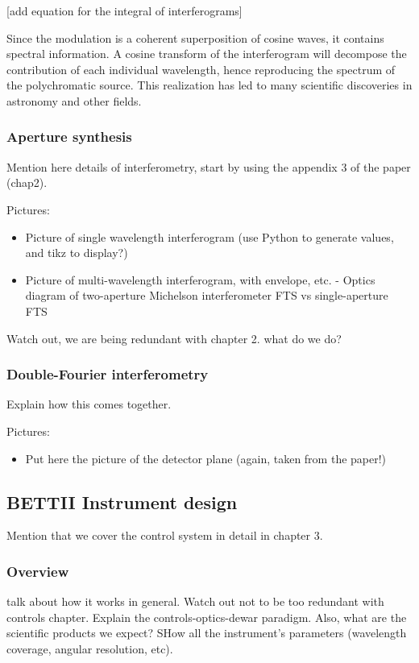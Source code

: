 [add equation for the integral of interferograms]



Since the modulation is a coherent superposition of cosine waves, it contains spectral information. A cosine transform of the interferogram will decompose the contribution of each individual wavelength, hence reproducing the spectrum of the polychromatic source. This realization has led to many scientific discoveries in astronomy and other fields.

\subsubsection{Aperture synthesis}
Mention here details of interferometry, start by using the appendix 3 of the paper (chap2). 

Pictures:
\begin{itemize}
\item Picture of single wavelength interferogram (use Python to generate values, and tikz to display?)
\item Picture of multi-wavelength interferogram, with envelope, etc.
- Optics diagram of two-aperture Michelson interferometer FTS vs single-aperture FTS
\end{itemize}

Watch out, we are being redundant with chapter 2. what do we do?

\subsubsection{Double-Fourier interferometry}

Explain how this comes together.

Pictures:
\begin{itemize}
\item Put here the picture of the detector plane (again, taken from the paper!)
\end{itemize}


\subsection{BETTII Instrument design}

Mention that we cover the control system in detail in chapter 3.

\subsubsection{Overview}
talk about how it works in general. Watch out not to be too redundant with controls chapter. Explain the controls-optics-dewar paradigm. Also, what are the scientific products we expect? SHow all the instrument's parameters (wavelength coverage, angular resolution, etc).

